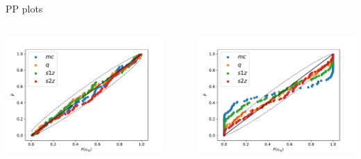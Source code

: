 \documentclass[serif]{beamer}
\begin{document}
\begin{frame}{}
\begin{columns}
\begin{column}[T]{0.35\textwidth}
\begin{block}{PP plots}
  \begin{center}
    \begin{columns}
      \begin{column}{0.45\textwidth}
        \includegraphics[width=\textwidth]{Images/pp_plot_SEOB}
      \end{column}
      ~
      \begin{column}{0.45\textwidth}
        \includegraphics[width=\textwidth]{Images/pp_plot_IMRD}
      \end{column}
    \end{columns}

\end{center}
\end{block}
\end{column}
\end{columns}
\end{frame}
\end{document}
